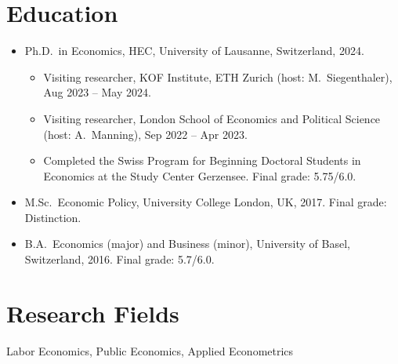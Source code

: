 \documentclass[11pt]{article}
\begin{document}
\section{Education}
\begin{itemize}
\item Ph.D.\ in Economics, HEC, University of Lausanne, Switzerland, 2024.
  \begin{itemize}[label=--]
  \item Visiting researcher, KOF Institute, ETH Zurich (host: M.~Siegenthaler), Aug 2023 -- May 2024.
  \item Visiting researcher, London School of Economics and Political Science (host: A.~Manning), Sep 2022 -- Apr 2023.
  \item Completed the Swiss Program for Beginning Doctoral Students in Economics at the Study Center Gerzensee. Final grade: 5.75/6.0.
  \end{itemize}
\item M.Sc.\ Economic Policy, University College London, UK, 2017. Final grade: Distinction.
\item B.A.\ Economics (major) and Business (minor), University of Basel, Switzerland, 2016. Final grade: 5.7/6.0.
\end{itemize}

\section{Research Fields}
Labor Economics, Public Economics, Applied Econometrics

\end{document}
